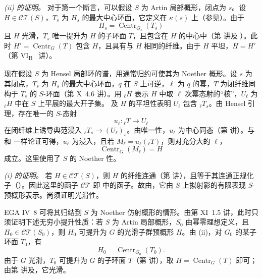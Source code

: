 \medskip\noindent\textit{(ii) 的证明。}
对于第一个断言，可以假设 \(S\) 为 Artin 局部概形，闭点为 \(s\)。设 \(H\in\mathcal{CT}(S)\)，\(T_s\) 为 \(H_s\) 的最大中心环面，它定义在 \(\kappa(s)\) 上（参见）。由于
\[
  H_s=\operatorname{Centr}_{G_s}(T_s)
\]
且 \(H\) 光滑，\(T_s\) 唯一提升为 \(H\) 的子环面 \(T\)，且包含在 \(H\) 的中心中（第  讲及 ）。此时 \(H'=\operatorname{Centr}_G(T)\) 包含 \(H\)，且具有与 \(H\) 相同的纤维。由于 \(H\) 平坦，\(H=H'\)（第 VI\textsubscript{B}~ 讲）。

现在假设 \(S\) 为 Hensel 局部环的谱，用通常归约可使其为 Noether 概形。设 \(s\) 为其闭点，\(T_s\) 为 \(H_s\) 的最大中心环面，\(q\) 在 \(S\) 上可逆，\(\ell\) 为 \(q\) 的幂，\(T\) 为闭纤维同构于 \(T_s\) 的 \(S\)-环面（第 X~4.6 讲）。用 \({}_\ell H\) 表示 \(H\) 中取 \(\ell\) 次幂态射的“核”，\(U_\ell\) 为 \({}_\ell H\) 中在 \(S\) 上平展的最大开子集。 及 \(H\) 的平坦性表明 \(U_\ell\) 包含 \({}_\ell T_s\)。由 Hensel 引理，存在唯一的 \(S\)-态射
\[
  u_\ell:{}_\ell T\longrightarrow U_\ell
\]
在闭纤维上诱导典范浸入 \({}_\ell T_s\to(U_\ell)_s\)。由唯一性，\(u_\ell\) 为中心同态（第  讲）。与  和  一样论证可得，\(u_\ell\) 为浸入，且若 \(M_\ell=u_\ell({}_\ell T)\)，则对充分大的 \(\ell\)，
\[
  \operatorname{Centr}_G(M_\ell)=H
\]
成立。这里使用了 \(S\) 的 Noether 性。

\medskip\noindent\textit{(i) 的证明。}
若 \(H\in\mathcal{CT}(S)\)，则 \(H\) 的纤维连通（第  讲），且等于其连通正规化子（）。因此这里的函子 \(\mathcal{CT}\) 即  中的函子。故由，它由 \(S\) 上拟射影的有限表现 \(S\)-预概形表示。尚须证明光滑性。

EGA IV~8 可将其归结到 \(S\) 为 Noether 仿射概形的情形。由第 XI~1.5 讲，此时只须证明下述无穷小提升性质：若 \(S\) 为 Artin 局部概形，\(S_0\) 由幂零理想定义，且 \(H_0\in\mathcal{CT}(S_0)\)，则 \(H_0\) 可提升为 \(G\) 的光滑子群预概形 \(H\)。由 (ii)，对 \(G_0\) 的某子环面 \(T_0\)，有
\[
 H_0=\operatorname{Centr}_{G_0}(T_0).
\]
由于 \(G\) 光滑，\(T_0\) 可提升为 \(G\) 的子环面 \(T\)（第  讲），取 \(H=\operatorname{Centr}_G(T)\) 即可；由第  讲及，它光滑。

